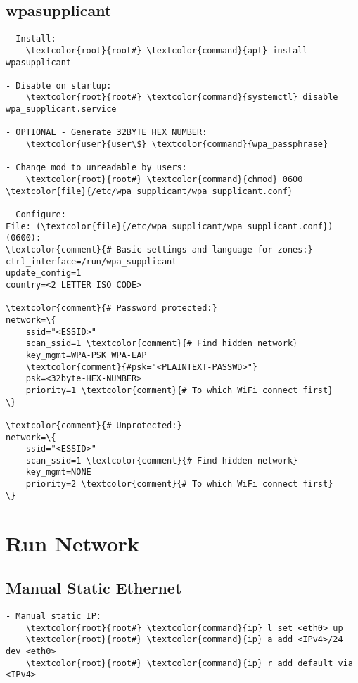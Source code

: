 \documentclass[10pt, a4paper, onecolumn, openany]{book} %
\begin{document}
\subsection{wpasupplicant}
\begin{Verbatim}[commandchars=\\\{\}]
- Install:
    \textcolor{root}{root#} \textcolor{command}{apt} install wpasupplicant

- Disable on startup:
    \textcolor{root}{root#} \textcolor{command}{systemctl} disable wpa_supplicant.service

- OPTIONAL - Generate 32BYTE HEX NUMBER:
    \textcolor{user}{user\$} \textcolor{command}{wpa_passphrase}

- Change mod to unreadable by users:
    \textcolor{root}{root#} \textcolor{command}{chmod} 0600 \textcolor{file}{/etc/wpa_supplicant/wpa_supplicant.conf}

- Configure:
File: (\textcolor{file}{/etc/wpa_supplicant/wpa_supplicant.conf}) (0600):
\textcolor{comment}{# Basic settings and language for zones:}
ctrl_interface=/run/wpa_supplicant
update_config=1
country=<2 LETTER ISO CODE>

\textcolor{comment}{# Password protected:}
network=\{
    ssid="<ESSID>"
    scan_ssid=1 \textcolor{comment}{# Find hidden network}
    key_mgmt=WPA-PSK WPA-EAP
    \textcolor{comment}{#psk="<PLAINTEXT-PASSWD>"}
    psk=<32byte-HEX-NUMBER>
    priority=1 \textcolor{comment}{# To which WiFi connect first}
\}

\textcolor{comment}{# Unprotected:}
network=\{
    ssid="<ESSID>"
    scan_ssid=1 \textcolor{comment}{# Find hidden network}
    key_mgmt=NONE
    priority=2 \textcolor{comment}{# To which WiFi connect first}
\}
\end{Verbatim}


\section{Run Network}
\subsection{Manual Static Ethernet}
\begin{Verbatim}[commandchars=\\\{\}]
- Manual static IP:
    \textcolor{root}{root#} \textcolor{command}{ip} l set <eth0> up
    \textcolor{root}{root#} \textcolor{command}{ip} a add <IPv4>/24 dev <eth0>
    \textcolor{root}{root#} \textcolor{command}{ip} r add default via <IPv4>
\end{Verbatim}
\end{document}
